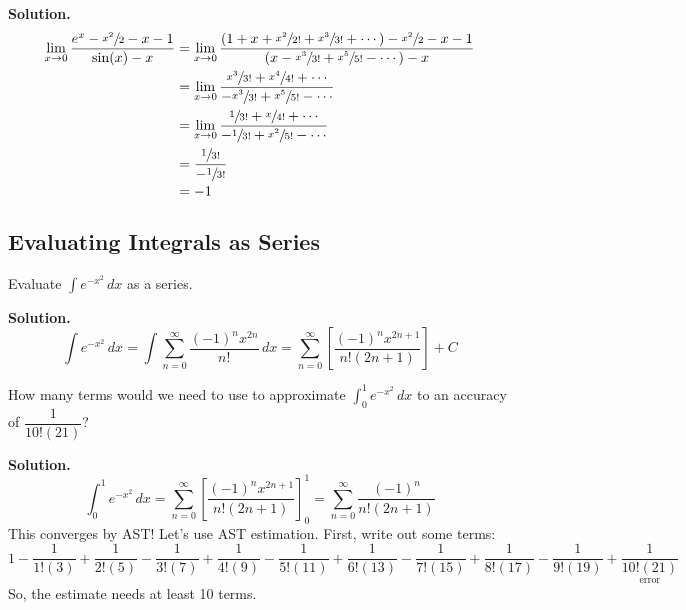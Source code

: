 \begin{Example}{}{}
\begin{enumerate}[label=(\roman*)]
              \textbf{Solution.}
              \begin{align*}
                  \lim\limits_{{x} \to {0}} \frac{e^x-\sfrac{x^2}{2} -x-1}{\sin(x)-x}
                   & =\lim\limits_{{x} \to {0}}
                  \frac{\left( 1+x+\sfrac{x^2}{2!}+\sfrac{x^3}{3!}+\cdots \right)-
                  \sfrac{x^2}{2} -x-1}{\left( x-\sfrac{x^3}{3!} +\sfrac{x^5}{5!} -\cdots \right)-x}       \\
                   & =\lim\limits_{{x} \to {0}}
                  \frac{\sfrac{x^3}{3!} +\sfrac{x^4}{4!}+\cdots}{-\sfrac{x^3}{3!}+\sfrac{x^5}{5!}-\cdots} \\
                   & =\lim\limits_{{x} \to {0}}
                  \frac{\sfrac{1}{3!}+\sfrac{x}{4!}+\cdots}{-\sfrac{1}{3!}+\sfrac{x^2}{5!} -\cdots}       \\
                   & =\frac{\sfrac{1}{3!}  }{-\sfrac{1}{3!}  }                                            \\
                   & =-1
              \end{align*}
    \end{enumerate}
\end{Example}

\subsection*{Evaluating Integrals as Series}

\begin{Example}{}{}
    Evaluate $ \displaystyle \int e^{-x^2}\, d{x} $ as a series.

    \textbf{Solution.}
    \[ \int e^{-x^2}\, d{x}
        =\int \sum\limits_{n=0}^{\infty} \frac{(-1)^n x^{2n}}{n!} \, d{x}
        =\sum\limits_{n=0}^{\infty} \left[ \frac{(-1)^n x^{2n+1}}{n!(2n+1)} \right]+C \]
\end{Example}

\begin{Example}{}{}
    How many terms would we need to use to approximate
    $ \displaystyle \int_{0}^{1} e^{-x^2}\, d{x} $
    to an accuracy of $ \dfrac{1}{10!(21)} $?

    \textbf{Solution.}
    \[ \int_{0}^{1} e^{-x^2}\, d{x}
        = \sum\limits_{n=0}^{\infty}\left[ \frac{(-1)^n x^{2n+1}}{n!(2n+1)} \right]_0^1
        =\sum\limits_{n=0}^{\infty} \frac{(-1)^n}{n!(2n+1)}   \]
    This converges by AST\@! Let's use AST estimation. First, write out some terms:
    \[ 1-\frac{1}{1!(3)} +\frac{1}{2!(5)} -\frac{1}{3!(7)} +\frac{1}{4!(9)}-
        \frac{1}{5!(11)}+\frac{1}{6!(13)} -\frac{1}{7!(15)} +\frac{1}{8!(17)} -\frac{1}{9!(19)} +
        \underset{\text{error}}{\boxed{\frac{1}{10!(21)}}} \]
    So, the estimate needs at least 10 terms.
\end{Example}

